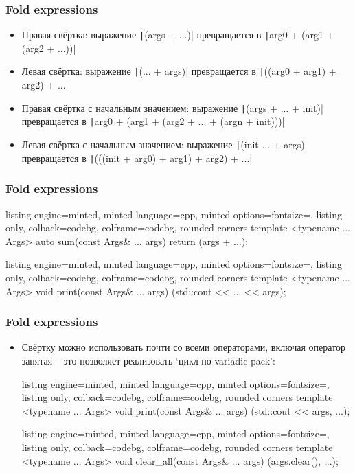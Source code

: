 \documentclass[10pt]{beamer}
\begin{document}
\begin{frame}[fragile]
\frametitle{Fold expressions}
\begin{itemize}
\item Правая свёртка: выражение \texttt|(args + ...)| превращается в \texttt|arg0 + (arg1 + (arg2 + ...))|
\pause
\item Левая свёртка: выражение \texttt|(... + args)| превращается в \texttt|((arg0 + arg1) + arg2) + ...|
\pause
\item Правая свёртка с начальным значением: выражение \texttt|(args + ... + init)| превращается в \texttt|arg0 + (arg1 + (arg2 + ... + (argn + init)))|
\pause
\item Левая свёртка с начальным значением: выражение \texttt|(init ... + args)| превращается в \texttt|(((init + arg0) + arg1) + arg2) + ...|
\end{itemize}
\end{frame}

\begin{frame}[fragile]
\frametitle{Fold expressions}
\begin{itemize}
\begin{tcblisting}{listing engine=minted, minted language=cpp, minted options={fontsize=\scriptsize}, listing only, colback=codebg, colframe=codebg, rounded corners}
template <typename ... Args>
auto sum(const Args& ... args) {
  return (args + ...);
}
\end{tcblisting}
\pause
\begin{tcblisting}{listing engine=minted, minted language=cpp, minted options={fontsize=\scriptsize}, listing only, colback=codebg, colframe=codebg, rounded corners}
template <typename ... Args>
void print(const Args& ... args) {
  (std::cout << ... << args);
}
\end{tcblisting}
\end{itemize}
\end{frame}

\begin{frame}[fragile]
\frametitle{Fold expressions}
\begin{itemize}
\item Свёртку можно использовать почти со всеми операторами, включая оператор запятая -- это позволяет реализовать `цикл по variadic pack':
\begin{tcblisting}{listing engine=minted, minted language=cpp, minted options={fontsize=\scriptsize}, listing only, colback=codebg, colframe=codebg, rounded corners}
template <typename ... Args>
void print(const Args& ... args) {
  (std::cout << args, ...);
}
\end{tcblisting}
\begin{tcblisting}{listing engine=minted, minted language=cpp, minted options={fontsize=\scriptsize}, listing only, colback=codebg, colframe=codebg, rounded corners}
template <typename ... Args>
void clear_all(const Args& ... args) {
  (args.clear(), ...);
}
\end{tcblisting}
\end{itemize}
\end{frame}
\end{document}
